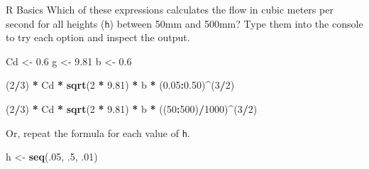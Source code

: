 \documentclass[
  ignorenonframetext,
]{beamer}
\newenvironment{Shaded}{\begin{snugshade}}{\end{snugshade}}
\newcommand{\DecValTok}[1]{\textcolor[rgb]{0.00,0.00,0.81}{#1}}
\newcommand{\FloatTok}[1]{\textcolor[rgb]{0.00,0.00,0.81}{#1}}
\newcommand{\KeywordTok}[1]{\textcolor[rgb]{0.13,0.29,0.53}{\textbf{#1}}}
\newcommand{\NormalTok}[1]{#1}
\newcommand{\OperatorTok}[1]{\textcolor[rgb]{0.81,0.36,0.00}{\textbf{#1}}}
\newcommand{\StringTok}[1]{\textcolor[rgb]{0.31,0.60,0.02}{#1}}
\begin{document}
\begin{frame}[fragile]{R Basics}
\protect\hypertarget{r-basics}{}
Which of these expressions calculates the flow in cubic meters per
second for all heights (\texttt{h}) between 50mm and 500mm? Type them
into the console to try each option and inspect the output.

\begin{Shaded}
\begin{Highlighting}[]
\NormalTok{Cd \textless{}{-}}\StringTok{ }\FloatTok{0.6}
\NormalTok{g \textless{}{-}}\StringTok{ }\FloatTok{9.81}
\NormalTok{b \textless{}{-}}\StringTok{ }\FloatTok{0.6}

\NormalTok{(}\DecValTok{2}\OperatorTok{/}\DecValTok{3}\NormalTok{) }\OperatorTok{*}\StringTok{ }\NormalTok{Cd }\OperatorTok{*}\StringTok{ }\KeywordTok{sqrt}\NormalTok{(}\DecValTok{2} \OperatorTok{*}\StringTok{ }\FloatTok{9.81}\NormalTok{) }\OperatorTok{*}\StringTok{ }\NormalTok{b }\OperatorTok{*}\StringTok{ }\NormalTok{(}\FloatTok{0.05}\OperatorTok{:}\FloatTok{0.50}\NormalTok{)}\OperatorTok{\^{}}\NormalTok{(}\DecValTok{3}\OperatorTok{/}\DecValTok{2}\NormalTok{)}

\NormalTok{(}\DecValTok{2}\OperatorTok{/}\DecValTok{3}\NormalTok{) }\OperatorTok{*}\StringTok{ }\NormalTok{Cd }\OperatorTok{*}\StringTok{ }\KeywordTok{sqrt}\NormalTok{(}\DecValTok{2} \OperatorTok{*}\StringTok{ }\FloatTok{9.81}\NormalTok{) }\OperatorTok{*}\StringTok{ }\NormalTok{b }\OperatorTok{*}\StringTok{ }\NormalTok{((}\DecValTok{50}\OperatorTok{:}\DecValTok{500}\NormalTok{)}\OperatorTok{/}\DecValTok{1000}\NormalTok{)}\OperatorTok{\^{}}\NormalTok{(}\DecValTok{3}\OperatorTok{/}\DecValTok{2}\NormalTok{)}
\end{Highlighting}
\end{Shaded}

Or, repeat the formula for each value of \texttt{h}.

\begin{Shaded}
\begin{Highlighting}[]
\NormalTok{h \textless{}{-}}\StringTok{ }\KeywordTok{seq}\NormalTok{(.}\DecValTok{05}\NormalTok{, }\FloatTok{.5}\NormalTok{, }\FloatTok{.01}\NormalTok{)}
\end{Highlighting}
\end{Shaded}
\end{frame}
\end{document}
